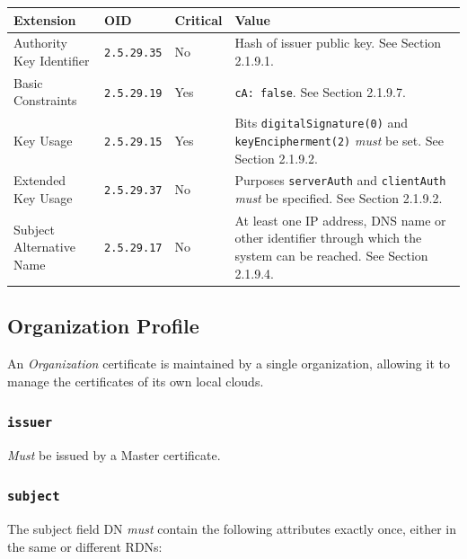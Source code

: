 \vspace*{0.5cm}
\noindent\begin{tabularx}{\textwidth}{| p{4cm} | p{2cm} | p{1.2cm} | X |} \hline
\rowcolor{gray!33} Extension & OID                & Critical & Value \\ \hline

Authority Key Identifier     & \texttt{2.5.29.35} & No       & Hash of issuer public key. See Section 2.1.9.1. \\ \hline
Basic Constraints            & \texttt{2.5.29.19} & Yes      & \texttt{cA: false}. See Section 2.1.9.7. \\ \hline
Key Usage                    & \texttt{2.5.29.15} & Yes      & Bits \texttt{digitalSignature(0)} and \texttt{keyEncipherment(2)} \textit{must} be set. See Section 2.1.9.2. \\ \hline
Extended Key Usage           & \texttt{2.5.29.37} & No       & Purposes \texttt{serverAuth} and \texttt{clientAuth} \textit{must} be specified. See Section 2.1.9.2. \\ \hline
Subject Alternative Name     & \texttt{2.5.29.17} & No       & At least one IP address, DNS name or other identifier through which the system can be reached. See Section 2.1.9.4. \\ \hline

\end{tabularx}
\vspace*{0.5cm}

\newpage
\subsection{Organization Profile}

An \textit{Organization} certificate is maintained by a single organization, allowing it to manage the certificates of its own local clouds.

\subsubsection{\texttt{issuer}}

\textit{Must} be issued by a Master certificate.

\subsubsection{\texttt{subject}}

The subject field DN \textit{must} contain the following attributes exactly once, either in the same or different RDNs:

